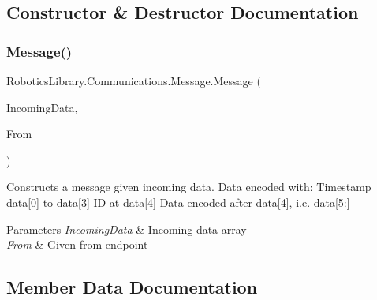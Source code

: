 \subsection{Constructor \& Destructor Documentation}
\mbox{\label{class_robotics_library_1_1_communications_1_1_message_a9e6e25188a64e3cc1c71282c2578cc4e}} 
\subsubsection{\texorpdfstring{Message()}{Message()}}
{\footnotesize\ttfamily Robotics\+Library.\+Communications.\+Message.\+Message (\begin{DoxyParamCaption}\item[{byte \mbox{[}$\,$\mbox{]}}]{Incoming\+Data,  }\item[{I\+P\+End\+Point}]{From }\end{DoxyParamCaption})}



Constructs a message given incoming data. Data encoded with\+: Timestamp data\mbox{[}0\mbox{]} to data\mbox{[}3\mbox{]} ID at data\mbox{[}4\mbox{]} Data encoded after data\mbox{[}4\mbox{]}, i.\+e. data\mbox{[}5\+:\mbox{]} 


\begin{DoxyParams}{Parameters}
{\em Incoming\+Data} & Incoming data array\\
\hline
{\em From} & Given from endpoint\\
\hline
\end{DoxyParams}


\subsection{Member Data Documentation}
\mbox{\label{class_robotics_library_1_1_communications_1_1_message_a69bb31eb51f778726ae40b2257e7e053}} 
